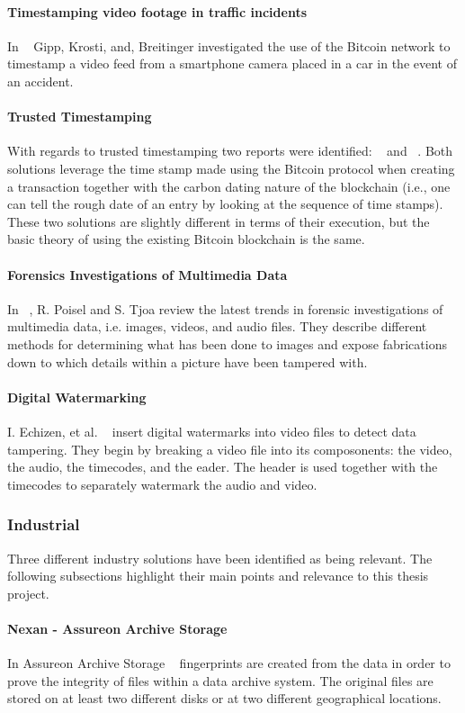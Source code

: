 \paragraph{Timestamping video footage in traffic incidents}
In ~\cite{gkb_bitcoin} Gipp, Krosti, and, Breitinger investigated the use of the Bitcoin network to timestamp a video feed from a smartphone camera placed in a car in the event of an accident.
\paragraph{Trusted Timestamping}
With regards to trusted timestamping two reports were identified:  ~\cite{gmg_bitcoin} and  ~\cite{ce_commitcoin}. Both solutions leverage the time stamp made using the Bitcoin protocol when creating a transaction together with the carbon dating nature of the blockchain (i.e., one can tell the rough date of an entry by looking at the sequence of time stamps). These two solutions are slightly different in terms of their execution, but the basic theory of using the existing Bitcoin blockchain is the same.
\paragraph{Forensics Investigations of Multimedia Data}
In ~\cite{pt_forensics}, R. Poisel and S. Tjoa review the latest trends in forensic investigations of multimedia data, i.e. images, videos, and audio files. They describe different methods for determining what has been done to images and expose fabrications down to which details within a picture have been tampered with.
\paragraph{Digital Watermarking}
I. Echizen, et al. ~\cite{esytth_watermark} insert digital watermarks into video files to detect data tampering. They begin by breaking a video file into its composonents: the video, the audio, the timecodes, and the eader. The header is used together with the timecodes to separately watermark the audio and video.
\subsubsection{Industrial}
Three different industry solutions have been identified as being relevant. The following subsections highlight their main points and relevance to this thesis project.
\paragraph{Nexan - Assureon Archive Storage}
In Assureon Archive Storage ~\cite{n_assureon} fingerprints are created from the data in order to prove the integrity of files within a data archive system. The original files are stored on at least two different disks or at two different geographical locations.
